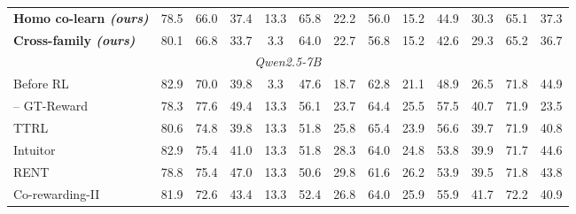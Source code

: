 \begin{table}[t]
\begin{tabular}{lcccccccccccc}
\textbf{Homo co-learn \emph{(ours)}} & \cellcolor{heat!37}78.5 & \cellcolor{heat!48}66.0 & \cellcolor{heat!58}37.4 & \cellcolor{heat!58}13.3 & \cellcolor{heat!58}65.8 & \cellcolor{heat!29}22.2 & \cellcolor{heat!52}56.0 & \cellcolor{heat!41}15.2 & \cellcolor{heat!58}44.9 & \cellcolor{heat!53}30.3 & \cellcolor{heat!21}65.1 & \cellcolor{heat!58}37.3 \\
\textbf{Cross-family \emph{(ours)}} & \cellcolor{heat!50}80.1 & \cellcolor{heat!58}66.8 & \cellcolor{heat!41}33.7 & \cellcolor{heat!19}3.3 & \cellcolor{heat!44}64.0 & \cellcolor{heat!32}22.7 & \cellcolor{heat!58}56.8 & \cellcolor{heat!41}15.2 & \cellcolor{heat!49}42.6 & \cellcolor{heat!40}29.3 & \cellcolor{heat!58}65.2 & \cellcolor{heat!50}36.7 \\
\midrule
\multicolumn{13}{c}{\textit{Qwen2.5-7B}}\\
\midrule
Before RL & 82.9 & 70.0 & 39.8 & 3.3 & 47.6 & 18.7 & 62.8 & 21.1 & 48.9 & 26.5 & 71.8 & 44.9 \\
\hspace{1em}-- GT-Reward & 78.3 & 77.6 & 49.4 & 13.3 & 56.1 & 23.7 & 64.4 & 25.5 & 57.5 & 40.7 & 71.9 & 23.5 \\
\cmidrule(lr){1-13}
TTRL & \cellcolor{heat!28}80.6 & \cellcolor{heat!47}74.8 & \cellcolor{heat!13}39.8 & \cellcolor{heat!58}13.3 & \cellcolor{heat!23}51.8 & \cellcolor{heat!6}25.8 & \cellcolor{heat!55}65.4 & \cellcolor{heat!6}23.9 & \cellcolor{heat!39}56.6 & \cellcolor{heat!11}39.7 & \cellcolor{heat!28}71.9 & \cellcolor{heat!40}40.8 \\
Intuitor & \cellcolor{heat!58}82.9 & \cellcolor{heat!58}75.4 & \cellcolor{heat!21}41.0 & \cellcolor{heat!58}13.3 & \cellcolor{heat!23}51.8 & \cellcolor{heat!17}28.3 & \cellcolor{heat!37}64.0 & \cellcolor{heat!24}24.8 & \cellcolor{heat!6}53.8 & \cellcolor{heat!15}39.9 & \cellcolor{heat!6}71.7 & \cellcolor{heat!58}44.6 \\
RENT & \cellcolor{heat!6}78.8 & \cellcolor{heat!58}75.4 & \cellcolor{heat!58}47.0 & \cellcolor{heat!58}13.3 & \cellcolor{heat!6}50.6 & \cellcolor{heat!23}29.8 & \cellcolor{heat!6}61.6 & \cellcolor{heat!49}26.2 & \cellcolor{heat!7}53.9 & \cellcolor{heat!6}39.5 & \cellcolor{heat!16}71.8 & \cellcolor{heat!54}43.8 \\
Co-rewarding-II & \cellcolor{heat!45}81.9 & \cellcolor{heat!6}72.6 & \cellcolor{heat!36}43.4 & \cellcolor{heat!58}13.3 & \cellcolor{heat!32}52.4 & \cellcolor{heat!10}26.8 & \cellcolor{heat!37}64.0 & \cellcolor{heat!44}25.9 & \cellcolor{heat!30}55.9 & \cellcolor{heat!58}41.7 & \cellcolor{heat!58}72.2 & \cellcolor{heat!41}40.9 \\

\end{tabular}
\end{table}
